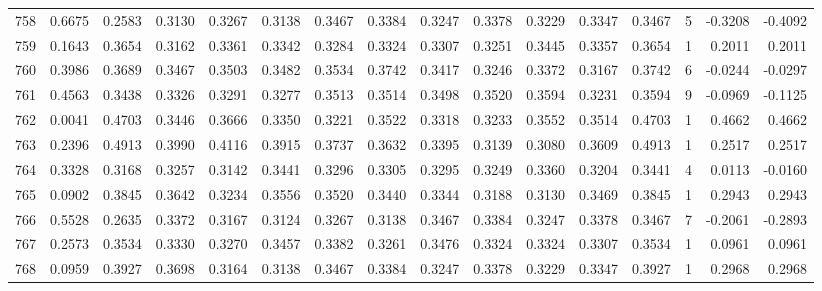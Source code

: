 \begin{tabular}{lrrrrrrrrrrrrrrr}
758 &      0.6675 &  0.2583 &  0.3130 &  0.3267 &  0.3138 &  0.3467 &  0.3384 &  0.3247 &  0.3378 &  0.3229 &   0.3347 &     0.3467 &      5 &                   -0.3208 &                    -0.4092 \\
759 &      0.1643 &  0.3654 &  0.3162 &  0.3361 &  0.3342 &  0.3284 &  0.3324 &  0.3307 &  0.3251 &  0.3445 &   0.3357 &     0.3654 &      1 &                    0.2011 &                     0.2011 \\
760 &      0.3986 &  0.3689 &  0.3467 &  0.3503 &  0.3482 &  0.3534 &  0.3742 &  0.3417 &  0.3246 &  0.3372 &   0.3167 &     0.3742 &      6 &                   -0.0244 &                    -0.0297 \\
761 &      0.4563 &  0.3438 &  0.3326 &  0.3291 &  0.3277 &  0.3513 &  0.3514 &  0.3498 &  0.3520 &  0.3594 &   0.3231 &     0.3594 &      9 &                   -0.0969 &                    -0.1125 \\
762 &      0.0041 &  0.4703 &  0.3446 &  0.3666 &  0.3350 &  0.3221 &  0.3522 &  0.3318 &  0.3233 &  0.3552 &   0.3514 &     0.4703 &      1 &                    0.4662 &                     0.4662 \\
763 &      0.2396 &  0.4913 &  0.3990 &  0.4116 &  0.3915 &  0.3737 &  0.3632 &  0.3395 &  0.3139 &  0.3080 &   0.3609 &     0.4913 &      1 &                    0.2517 &                     0.2517 \\
764 &      0.3328 &  0.3168 &  0.3257 &  0.3142 &  0.3441 &  0.3296 &  0.3305 &  0.3295 &  0.3249 &  0.3360 &   0.3204 &     0.3441 &      4 &                    0.0113 &                    -0.0160 \\
765 &      0.0902 &  0.3845 &  0.3642 &  0.3234 &  0.3556 &  0.3520 &  0.3440 &  0.3344 &  0.3188 &  0.3130 &   0.3469 &     0.3845 &      1 &                    0.2943 &                     0.2943 \\
766 &      0.5528 &  0.2635 &  0.3372 &  0.3167 &  0.3124 &  0.3267 &  0.3138 &  0.3467 &  0.3384 &  0.3247 &   0.3378 &     0.3467 &      7 &                   -0.2061 &                    -0.2893 \\
767 &      0.2573 &  0.3534 &  0.3330 &  0.3270 &  0.3457 &  0.3382 &  0.3261 &  0.3476 &  0.3324 &  0.3324 &   0.3307 &     0.3534 &      1 &                    0.0961 &                     0.0961 \\
768 &      0.0959 &  0.3927 &  0.3698 &  0.3164 &  0.3138 &  0.3467 &  0.3384 &  0.3247 &  0.3378 &  0.3229 &   0.3347 &     0.3927 &      1 &                    0.2968 &                     0.2968 \\

\end{tabular}
